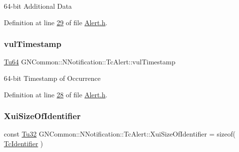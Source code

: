 64-\/bit Additional Data 

Definition at line \mbox{\hyperlink{_alert_8h_source_l00029}{29}} of file \mbox{\hyperlink{_alert_8h_source}{Alert.\+h}}.

\mbox{\label{class_g_n_common_1_1_n_notification_1_1_tc_alert_a3c6f656e3e526b9f97942188d7bb2930}} 
\subsubsection{\texorpdfstring{vul\+Timestamp}{vulTimestamp}}
{\footnotesize\ttfamily \mbox{\hyperlink{namespace_g_n_common_a9404ee6090c788ae70aebd1436ceb97d}{Tu64}} G\+N\+Common\+::\+N\+Notification\+::\+Tc\+Alert\+::vul\+Timestamp\hspace{0.3cm}{\ttfamily [protected]}}

64-\/bit Timestamp of Occurrence 

Definition at line \mbox{\hyperlink{_alert_8h_source_l00028}{28}} of file \mbox{\hyperlink{_alert_8h_source}{Alert.\+h}}.

\mbox{\label{class_g_n_common_1_1_n_notification_1_1_tc_alert_a44f63050a2f1c7a4876a31ce2ffd2d06}} 
\subsubsection{\texorpdfstring{Xui\+Size\+Of\+Identifier}{XuiSizeOfIdentifier}}
{\footnotesize\ttfamily const \mbox{\hyperlink{namespace_g_n_common_a941b527ef318f318aed7903dc832b7e4}{Tu32}} G\+N\+Common\+::\+N\+Notification\+::\+Tc\+Alert\+::\+Xui\+Size\+Of\+Identifier = sizeof( \mbox{\hyperlink{class_g_n_common_1_1_n_notification_1_1_tc_identifier}{Tc\+Identifier}} )\hspace{0.3cm}{\ttfamily [static]}}

